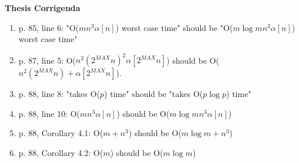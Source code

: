 \newif\ifFull
\Fullfalse
{} 
%

%
%
\DoubleSpace
\setlength{\oddsidemargin}{0pt}
\setlength{\evensidemargin}{0pt}
\setlength{\headsep}{0pt}
\setlength{\topmargin}{0pt}
\setlength{\textheight}{8.75in}
\setlength{\textwidth}{6.5in}
%
%

%
{\bf Thesis Corrigenda}
\vspace{.5in}
\begin{enumerate}
\item
	p. 85, line 6: "O($mn^{3}\alpha[n]$) worst case time" should be
	"O($m \log m n^{3}\alpha[n]$) worst case time" 
\item
	p. 87, line 5: O($n^{2}(2^{MAX}n)^{2}\alpha[2^{MAX}n]$) should be 
	O($n^{2}(2^{MAX}n) + \alpha[2^{MAX}n]$).
\item
	p. 88, line 8: "takes O($p$) time" should be "takes O($p \log p$) time"
\item	
	p. 88, line 10: O($mn^{3}\alpha[n]$) should be O($m \log m n^{3}\alpha[n]$)
\item
	p. 88, Corollary 4.1: O($m+n^{3}$) should be O($m \log m +n^{3}$)
\item
	p. 88, Corollary 4.2: O($m$) should be O($m \log m$)
\end{enumerate}

